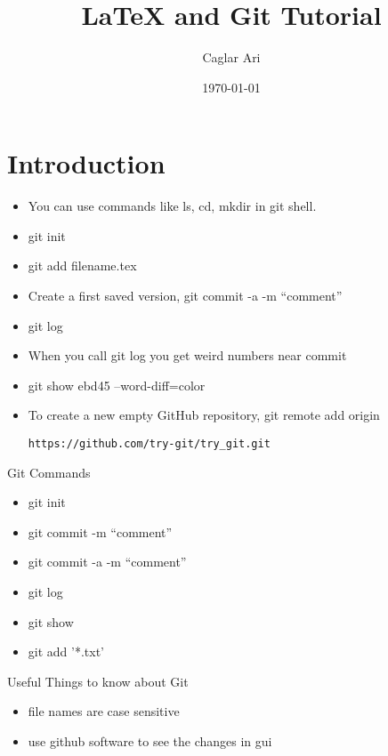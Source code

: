 \documentclass[12pt]{article}
\begin{document}
\title{\LaTeX\; and Git Tutorial}
\author{Caglar Ari}
\date{\today}
\maketitle
{}

\section{Introduction}
\begin{itemize}
\item You can use commands like ls, cd, mkdir in git shell.
\item git init
\item git add filename.tex
\item Create a first saved version, git commit -a -m "`comment"'
\item git log
\item When you call git log you get weird numbers near commit
\item git show ebd45 --word-diff=color
\item To create a new empty GitHub repository, git remote add origin \begin{verbatim}https://github.com/try-git/try_git.git \end{verbatim} 
\end{itemize}

Git Commands
\begin{itemize}
\item git init
\item git commit -m "`comment"'
\item git commit -a -m "`comment"'
\item git log
\item git show
\item git add '*.txt'
\end{itemize}

Useful Things to know about Git
\begin{itemize}
\item file names are case sensitive
\item use github software to see the changes in gui
\end{itemize}
\end{document}
